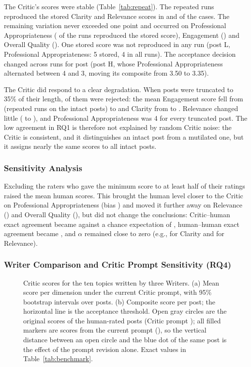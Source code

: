 \documentclass[a4paper,twoside]{article}
\begin{document}
The Critic's scores were stable (Table~\ref{tab:repeat}). The repeated runs reproduced the stored Clarity and Relevance scores in \RepEqualCla{} and \RepEqualRel{} of the cases. The remaining variation never exceeded one point and occurred on Professional Appropriateness (\RepEqualPro{} of the runs reproduced the stored score), Engagement (\RepEqualEng{}) and Overall Quality (\RepEqualOve{}). One stored score was not reproduced in any run (post L, Professional Appropriateness: 5 stored, 4 in all runs). The acceptance decision changed across runs for \RepFlips{} post (post H, whose Professional Appropriateness alternated between 4 and 3, moving its composite from 3.50 to 3.35).

The Critic did respond to a clear degradation. When posts were truncated to 35\% of their length, \TruncReject{} of them were rejected: the mean Engagement score fell from \RepMeanEng{} (repeated runs on the intact posts) to \TruncMeanEng{} and Clarity from \RepMeanCla{} to \TruncMeanCla{}. Relevance changed little (\RepMeanRel{} to \TruncMeanRel{}), and Professional Appropriateness was 4 for every truncated post. The low agreement in RQ1 is therefore not explained by random Critic noise: the Critic is consistent, and it distinguishes an intact post from a mutilated one, but it assigns nearly the same scores to all intact posts.

\subsubsection{Sensitivity Analysis}

Excluding the \FlaggedN{} raters who gave the minimum score to at least half of their ratings raised the mean human scores. This brought the human level closer to the Critic on Professional Appropriateness (bias \SensBiasPro{}) and moved it further away on Relevance (\SensBiasRel{}) and Overall Quality (\SensBiasOve{}), but did not change the conclusions: Critic--human exact agreement became \SensCHexAll{} against a chance expectation of \SensChanceExAll{}, human--human exact agreement became \SensHHexAll{}, and $\alpha$ remained close to zero (e.g., \SensAlphaCla{} for Clarity and \SensAlphaRel{} for Relevance).

\subsubsection{Writer Comparison and Critic Prompt Sensitivity (RQ4)}

\begin{figure}[t]
\centering

\caption{Critic scores for the ten topics written by three Writers. (a) Mean score per dimension under the current Critic prompt, with 95\% bootstrap intervals over posts. (b) Composite score per post; the horizontal line is the acceptance threshold. Open gray circles are the original scores of the human-rated posts (Critic prompt \BmOldHash{}); all filled markers are scores from the current prompt (\BmNewHash{}), so the vertical distance between an open circle and the blue dot of the same post is the effect of the prompt revision alone. Exact values in Table~\ref{tab:benchmark}.}
\label{fig:benchmark}
\end{figure}
\end{document}
